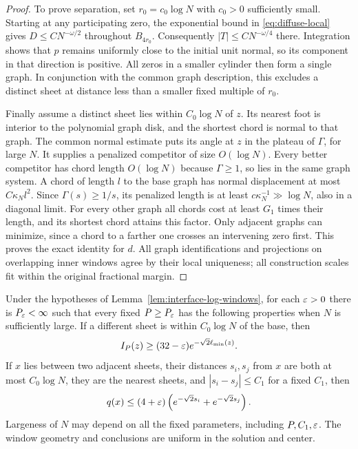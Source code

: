 \begin{proof}
To prove separation, set $r_0=c_0\log N$ with $c_0>0$ sufficiently
small.  Starting at any participating zero, the exponential bound in
\eqref{eq:diffuse-local} gives
$D\le CN^{-\omega/2}$ throughout $B_{4r_0}$.
Consequently $|T|\le CN^{-\omega/4}$ there.  Integration shows that
$p$ remains uniformly close to the initial unit normal, so its
component in that direction is positive.  All zeros in a smaller
cylinder then form a single graph.  In conjunction with the common
graph description, this excludes a distinct sheet at distance
less than a smaller fixed multiple of $r_0$.

Finally assume a distinct sheet lies within $C_0\log N$ of $z$.
Its nearest foot is interior to the polynomial graph disk, and the
shortest chord is normal to that graph.  The common normal estimate
puts its angle at $z$ in the plateau of $\Gamma$, for large $N$.
It supplies a penalized competitor of size $O(\log N)$.
Every better competitor has chord length $O(\log N)$ because
$\Gamma\ge1$, so lies in the same graph system.  A chord of length
$l$ to the base graph has normal displacement at most
$C\kappa_N l^2$.  Since $\Gamma(s)\ge1/s$, its penalized length
is at least $c\kappa_N^{-1}\gg\log N$, also in a diagonal limit.
For every other graph all chords cost at least $G_1$ times their
length, and its shortest chord attains this factor.  Only adjacent
graphs can minimize, since a chord to a farther one crosses an
intervening zero first.  This proves the exact identity for $d$.
All graph identifications and projections on overlapping inner
windows agree by their local uniqueness; all construction scales
fit within the original fractional margin.
\end{proof}

\begin{proposition}
\label{prop:interface-sharp-gaps}
Under the hypotheses of Lemma~\ref{lem:interface-log-windows},
for each $\varepsilon>0$ there is $P_\varepsilon<\infty$ such that every fixed
$P\ge P_\varepsilon$ has the following properties when $N$ is sufficiently
large.  If a different sheet is within $C_0\log N$ of the base, then
\begin{equation}\label{eq:L12}
 I_P(z)\ge(32-\varepsilon)e^{-\sqrt2\ell_{\min}(z)}.
\end{equation}
If $x$ lies between two adjacent sheets, their distances $s_i,s_j$
from $x$ are both at most $C_0\log N$, they are the nearest sheets,
and $|s_i-s_j|\le C_1$ for a fixed $C_1$, then
\begin{equation}\label{eq:L13}
 q(x)\le(4+\varepsilon)
       \left(e^{-\sqrt2s_i}+e^{-\sqrt2s_j}\right).
\end{equation}
Largeness of $N$ may depend on all the fixed parameters, including
$P,C_1,\varepsilon$.  The window geometry and conclusions are uniform in
the solution and center.
\end{proposition}

